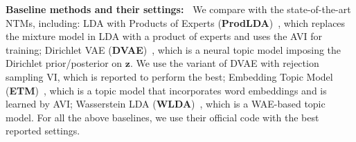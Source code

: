 \documentclass{article}
\renewcommand{\vec}{\boldsymbol}
\begin{document}
\textbf{Baseline methods and their settings:~}
We compare with the state-of-the-art NTMs, including:
LDA with Products of Experts (\textbf{ProdLDA})~\citep{srivastava2017autoencoding}, which replaces the mixture model in LDA with a product of experts and uses the AVI for training;
Dirichlet VAE (\textbf{DVAE})~\citep{burkhardt2019decoupling}, which is a neural topic model imposing the Dirichlet prior/posterior on $\vec{z}$. We use the variant of DVAE with rejection sampling VI, which is reported to perform the best;
Embedding Topic Model (\textbf{ETM})~\citep{dieng2019topic}, which is a topic model that incorporates word embeddings and is learned by AVI;
Wasserstein LDA (\textbf{WLDA})~\citep{nan2019topic}, which is a WAE-based topic model.
For all the above baselines, we use their official code with the best reported settings.
\end{document}
